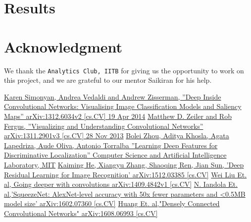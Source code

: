 \documentclass[conference]{IEEEtran}
\begin{document}
\section{Results}



\section*{Acknowledgment}

We thank the \texttt{Analytics Club, IITB} for giving us the opportunity to work on this project, and we are grateful to our mentor Saikiran for his help.


\begin{thebibliography}{00}
 \href{https://arxiv.org/pdf/1312.6034.pdf}{Karen Simonyan, Andrea Vedaldi and Andrew Zisserman, ''Deep Inside Convolutional Networks: Visualising
Image Classification Models and Saliency Maps'' arXiv:1312.6034v2 [cs.CV] 19 Apr 2014}
 \href{https://arxiv.org/pdf/1311.2901.pdf}{Matthew D. Zeiler and Rob Fergus, ''Visualizing and Understanding Convolutional Networks'' arXiv:1311.2901v3 [cs.CV] 28 Nov 2013}
 \href{http://cnnlocalization.csail.mit.edu/Zhou_Learning_Deep_Features_CVPR_2016_paper.pdf}{Bolei Zhou, Aditya Khosla, Agata Lapedriza, Aude Oliva, Antonio Torralba ''Learning Deep Features for Discriminative Localization'' Computer Science and Artificial Intelligence Laboratory, MIT}
 \href{https://arxiv.org/pdf/1512.03385.pdf}{Kaiming He, Xiangyu Zhang, Shaoqing Ren, Jian Sun, 'Deep Residual Learning for Image Recognition' arXiv:1512.03385 [cs.CV]}
 \href{https://arxiv.org/pdf/1409.4842.pdf}{Wei Liu Et. al, Going deeper with convolutions arXiv:1409.4842v1 [cs.CV]}
 \href{https://arxiv.org/pdf/1602.07360.pdf}{N. Iandola Et. al,'SqueezeNet: AlexNet-level accuracy with 50x fewer parameters and <0.5MB model size'	arXiv:1602.07360 [cs.CV]}
 \href{https://arxiv.org/pdf/1608.06993.pdf}{Huang Et. al,"Densely Connected Convolutional Networks" arXiv:1608.06993 [cs.CV]}
\end{thebibliography}
\end{document}
